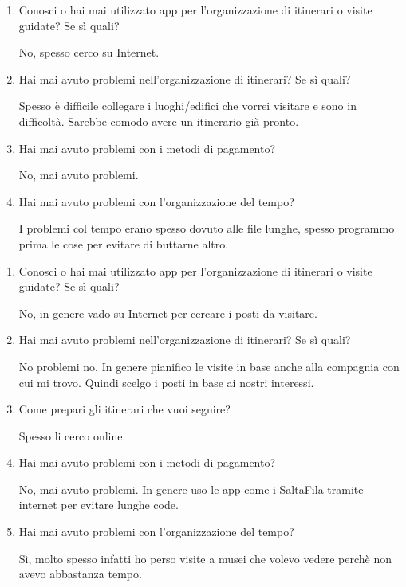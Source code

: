 \clearpage
{}

\begin{enumerate}

\item Conosci o hai mai utilizzato app per l'organizzazione di itinerari o visite guidate? Se sì quali?

No, spesso cerco su Internet.

\item Hai mai avuto problemi nell'organizzazione di itinerari? Se sì quali?

Spesso è difficile collegare i luoghi/edifici che vorrei visitare e sono in difficoltà. Sarebbe comodo avere un itinerario già pronto.

\item Hai mai avuto problemi con i metodi di pagamento?

No, mai avuto problemi.

\item Hai mai avuto problemi con l'organizzazione del tempo?

I problemi col tempo erano spesso dovuto alle file lunghe, spesso programmo prima le cose per evitare di buttarne altro.

\end{enumerate}

\clearpage
{}

\begin{enumerate}

\item Conosci o hai mai utilizzato app per l'organizzazione di itinerari o visite guidate? Se sì quali?

No, in genere vado su Internet per cercare i posti da visitare.

\item Hai mai avuto problemi nell'organizzazione di itinerari? Se sì quali?

No problemi no. In genere pianifico le visite in base anche alla compagnia con cui mi trovo. Quindi scelgo i posti in base ai nostri interessi.

\item Come prepari gli itinerari che vuoi seguire?

Spesso li cerco online.

\item Hai mai avuto problemi con i metodi di pagamento?

No, mai avuto problemi. In genere uso le app come i SaltaFila tramite internet per evitare lunghe code.

\item Hai mai avuto problemi con l'organizzazione del tempo?

Sì, molto spesso infatti ho perso visite a musei che volevo vedere perchè non avevo abbastanza tempo.

\end{enumerate}

